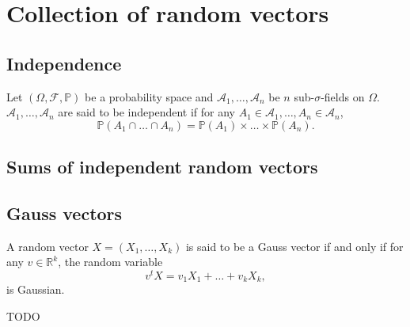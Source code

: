 \chapter{Collection of random vectors}%
\label{cha:Collection of random vectors}

\section{Independence}%
\label{sec:Independence}

\begin{definition}
    \label{def:Independent_sub-sigma-fields}
    Let $(\Omega, \mathcal{F}, \mathbb{P})$ be a probability space and $\mathcal{A}_1, \ldots,
    \mathcal{A}_n$ be $n$ sub-$\sigma$-fields on $\Omega$. $\mathcal{A}_1, \ldots, \mathcal{A}_n$
    are said to be independent if for any $A_1 \in \mathcal{A}_1, \ldots, A_n \in \mathcal{A}_n$,
    \[
    \mathbb{P}(A_1 \cap \ldots \cap A_n) = \mathbb{P}(A_1)\times \ldots \times \mathbb{P}(A_n)
    .\] 
\end{definition}

\section{Sums of independent random vectors}%
\label{sec:Sums of independent random vectors}

\section{Gauss vectors}%
\label{sec:Gauss vectors}
\begin{definition}
    \label{def:11.6}
    A random vector $X=(X_1, \ldots, X_k)$ is said to be a Gauss vector if and only if for any 
    $v \in \mathbb{R}^{k}$, the random variable
    \[
    v^{t}X = v_1X_1 + \ldots + v_kX_k,
    \] 
    is Gaussian.
\end{definition}

\begin{remark}[]
    \label{rem:11.11}
    TODO
\end{remark}

